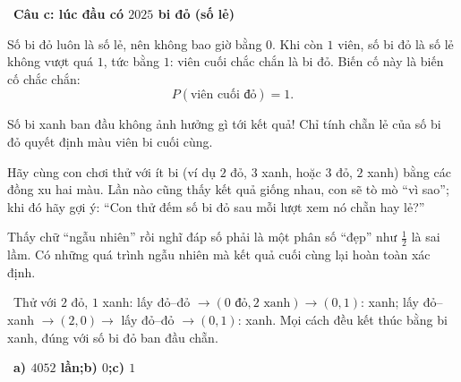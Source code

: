 \documentclass[11pt]{article}
\providecommand{\AnsWord}{Đáp số}
\newcommand{\ans}[1]{\par\smallskip{\bfseries\color{tmGreen!88!black}\AnsWord:}\ {\bfseries\color{AnsRed}#1}\par}
\newcommand{\step}[2]{\par\smallskip\noindent{\bfseries\color{tmBlue!85!black}\StepWord~#1.}\ {\bfseries #2}\par\nopagebreak}
\newcommand{\verify}[1]{\par\smallskip\noindent{\bfseries\color{tmGreen!80!black}\faCheckCircle\ \CheckWord}\ #1\par}
\def\AnsWord{Đáp số}
\def\StepWord{Bước}
\def\CheckWord{Thử lại:}
\begin{document}
{\step{4}{Câu c: lúc đầu có $2025$ bi đỏ (số lẻ)}
Số bi đỏ luôn là số lẻ, nên không bao giờ bằng $0$. Khi còn $1$ viên, số bi đỏ là số lẻ không vượt quá $1$, tức bằng $1$: viên cuối chắc
chắn là bi đỏ. Biến cố này là biến cố chắc chắn:
\[P(\text{viên cuối đỏ})=1.\]
\begin{tipbox}Số bi xanh ban đầu không ảnh hưởng gì tới kết quả! Chỉ tính chẵn lẻ của số bi đỏ quyết định màu viên bi cuối cùng.\end{tipbox}
\begin{parentbox}Hãy cùng con chơi thử với ít bi (ví dụ $2$ đỏ, $3$ xanh, hoặc $3$ đỏ, $2$ xanh) bằng các đồng xu hai màu. Lần nào cũng thấy
kết quả giống nhau, con sẽ tò mò ``vì sao''; khi đó hãy gợi ý: ``Con thử đếm số bi đỏ sau mỗi lượt xem nó chẵn hay lẻ?''\end{parentbox}
\begin{warnbox}Thấy chữ ``ngẫu nhiên'' rồi nghĩ đáp số phải là một phân số ``đẹp'' như $\frac12$ là sai lầm. Có những quá trình ngẫu nhiên mà kết quả cuối
cùng lại hoàn toàn xác định.\end{warnbox}
\verify{Thử với $2$ đỏ, $1$ xanh: lấy đỏ--đỏ $\to(0\text{ đỏ},2\text{ xanh})\to(0,1)$: xanh; lấy đỏ--xanh $\to(2,0)\to$ lấy đỏ--đỏ $\to(0,1)$: xanh.
Mọi cách đều kết thúc bằng bi xanh, đúng với số bi đỏ ban đầu chẵn.}
\ans{a) $4052$ lần;\quad b) $0$;\quad c) $1$}
}
\end{document}
